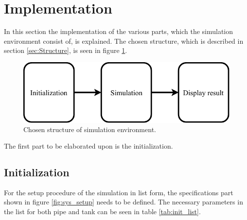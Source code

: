 \section{Implementation}\label{sec:implementation}

In this section the implementation of the various parts, which the simulation environment consist of, is explained. The chosen structure, which is described in section \ref{sec:Structure}, is seen in figure \ref{fig:Basic_implementation}. 

\begin{figure}[H]
\centering
\includegraphics[width=0.75 \textwidth]{report/simulation/pictures/Basic_implementation.pdf}
\caption{Chosen structure of simulation environment.}
\label{fig:Basic_implementation}
\end{figure}

The first part to be elaborated upon is the initialization.

 \subsection*{Initialization}

For the setup procedure of the simulation in list form, the specifications part shown in figure \ref{fig:sys_setup} needs to be defined. The necessary parameters in the list for both pipe and tank can be seen in table \ref {tab:init_list}. 

